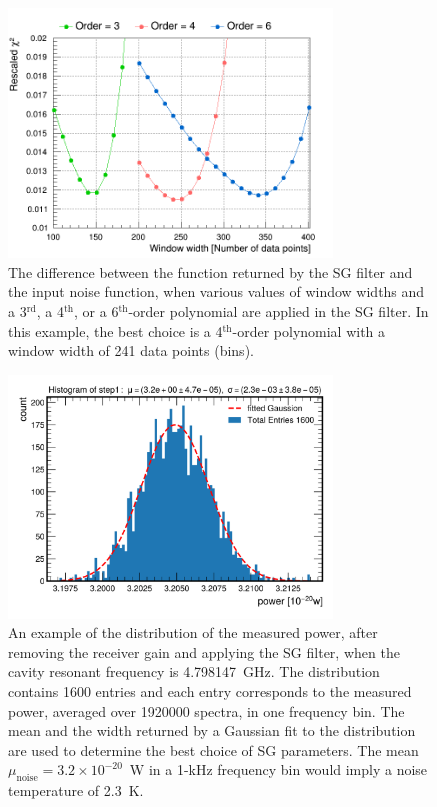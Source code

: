 \begin{figure} [htbp]
  \centering
  \includegraphics[width=8.6cm]{figures/chi2_Different_Order_Window_SGFilter.png}
  \caption{The difference between the function returned by the SG filter 
  and the input noise function, when various values of window widths and 
  a 3$^\text{rd}$, a 4$^\text{th}$, or a 
  6$^\text{th}$-order polynomial are applied in the SG filter. In this 
  example, the best choice is a 4$^\text{th}$-order polynomial with 
  a window width of 241 data points (bins). }
  \label{fig:sgoptimize}
\end{figure}
 


\begin{figure} [htbp]
  \centering
  \includegraphics[width=8.6cm]{figures/sysSG_temphistogram.png}
  \caption{An example of the distribution of the measured power, after 
removing the receiver gain and applying the SG filter, when 
the cavity resonant frequency is 4.798147~GHz. The distribution contains 
1600 entries and each entry corresponds to the measured power, averaged
over 1920000 spectra, in one frequency bin. The mean and the width returned by 
a Gaussian fit to the distribution are used to determine the best choice of 
SG parameters. The mean $\mu_\text{noise}=3.2\times10^{-20}$~W in 
a 1-kHz frequency bin would imply a noise temperature of 2.3~K.}
  \label{fig:noisegauss}
\end{figure}
 

